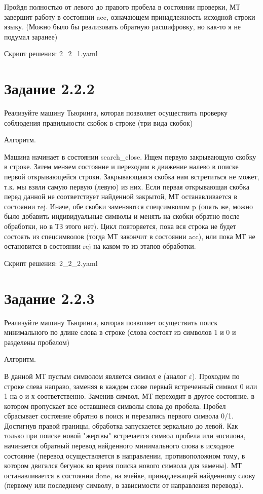 \documentclass{article}
\begin{document}
Пройдя полностью от левого до правого пробела в состоянии проверки, МТ завершит работу в состоянии acc, означающем принадлежность исходной строки языку. (Можно было бы реализовать обратную расшифровку, но как-то я не подумал заранее)\newline


Скрипт решения: 2\_2\_1.yaml\newline
\section{Задание 2.2.2}
Реализуйте машину Тьюринга, которая позволяет осуществить проверку соблюдения правильности скобок в строке (три вида  скобок)\newline

Алгоритм.\newline

Машина начинает в состоянии search\_close.
Ищем первую закрывающую скобку в строке. Затем меняем состояние и переходим в движение налево в поиске первой открывающейся строки. Закрывающаяся скобка нам встретиться не может, т.к. мы взяли самую первую (левую) из них. Если первая открывающая скобка перед данной не соответствует найденной закрытой, МТ останавливается в состоянии rej. Иначе, обе скобки заменяются спецсимволом p (опять же, можно было добавить индивидуальные символы и менять на скобки обратно после обработки, но в ТЗ этого нет).
Цикл повторяется, пока вся строка не будет состоять из спецсимволов (тогда МТ закончит в состоянии acc), или пока МТ не остановится в состоянии rej на каком-то из этапов обработки.


Скрипт решения: 2\_2\_2.yaml\newline
\section{Задание 2.2.3}
Реализуйте машину Тьюринга, которая позволяет осуществить поиск минимального по длине слова в строке (слова состоят из символов 1 и 0 и разделены пробелом)\newline

Алгоритм.\newline

В данной МТ пустым символом является символ е (аналог $\varepsilon$).\newline
Проходим по строке слева направо, заменяя в каждом слове первый встреченный символ 0 или 1 на о и х соответственно. Заменив символ, МТ переходит в другое состояние, в котором пропускает все оставшиеся символы слова до пробела. Пробел сбрасывает состояние обратно в поиск и перезапись первого символа 0/1. Достигнув правой границы, обработка запускается зеркально до левой.\newline
Как только при поиске новой "жертвы" встречается символ пробела или эпсилона, начинается обратный перевод найденного минимального слова в исходное состояние (перевод осуществляется в направлении, противоположном тому, в котором двигался бегунок во время поиска нового символа для замены).\newline
МТ останавливается в состоянии done, на ячейке, принадлежащей найденному слову (первому или последнему символу, в зависимости от направления перевода).
\end{document}
